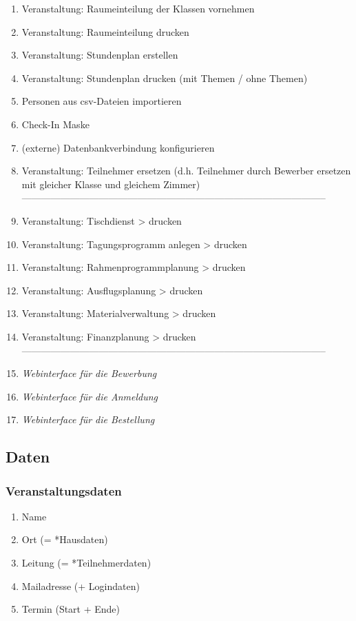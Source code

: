 \documentclass[a4paper]{scrartcl}
\begin{document}
\begin{enumerate}
		\item Veranstaltung: Raumeinteilung der Klassen vornehmen
		\item Veranstaltung: Raumeinteilung drucken
		\item Veranstaltung: Stundenplan erstellen
		\item Veranstaltung: Stundenplan drucken (mit Themen / ohne Themen)
		\item Personen aus csv-Dateien importieren
		\item Check-In Maske
		\item (externe) Datenbankverbindung konfigurieren
		\item Veranstaltung: Teilnehmer ersetzen (d.h. Teilnehmer durch Bewerber ersetzen mit gleicher Klasse und gleichem Zimmer)
		\\ -----------------------------------------------------------------------------------------------
		\item Veranstaltung: Tischdienst > drucken
		\item Veranstaltung: Tagungsprogramm anlegen > drucken
		\item Veranstaltung: Rahmenprogrammplanung > drucken
		\item Veranstaltung: Ausflugsplanung > drucken
		\item Veranstaltung: Materialverwaltung > drucken
		\item Veranstaltung: Finanzplanung > drucken
		\\ -----------------------------------------------------------------------------------------------
		\item \emph{Webinterface für die Bewerbung}
		\item \emph{Webinterface für die Anmeldung}
		\item \emph{Webinterface für die Bestellung}
	\end{enumerate}

	\subsection{Daten}
	\subsubsection{Veranstaltungsdaten}
		\begin{enumerate}
			\item Name
			\item Ort (= *Hausdaten)
			\item Leitung (= *Teilnehmerdaten)
			\item Mailadresse (+ Logindaten)
			\item Termin (Start + Ende)
		\end{enumerate}
		
\end{document}
